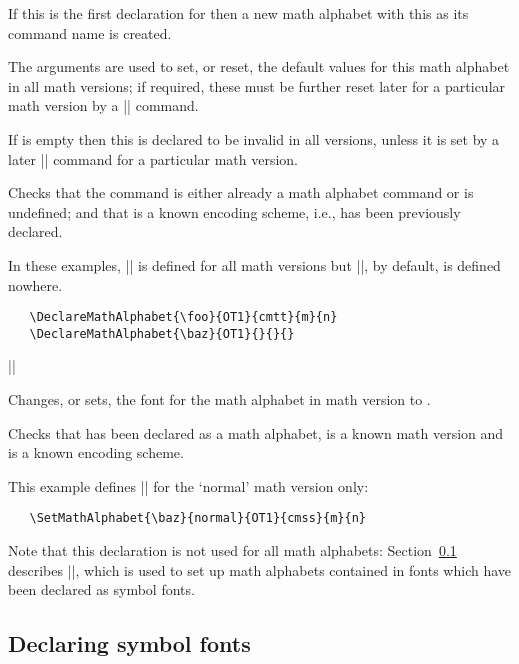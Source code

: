 \documentclass{ltxguide}[1995/11/28]
\begin{document}
If this is the first declaration for  then a new math
alphabet with this as its command name is created.

The arguments     are used to
set, or reset, the default values for this math alphabet in all math
versions; if required, these must be further reset later for a
particular math version by a |\SetMathAlphabet| command.

If  is empty then this  is declared to be invalid
in all versions, unless it is set by a later |\SetMathAlphabet| command
for a particular math version.

Checks that the command  is either already a math alphabet
command or is undefined; and that  is a known encoding
scheme, i.e., has been previously declared.

In these examples, |\foo| is defined for all math versions but |\baz|,
by default, is defined nowhere.
\begin{verbatim}
   \DeclareMathAlphabet{\foo}{OT1}{cmtt}{m}{n}
   \DeclareMathAlphabet{\baz}{OT1}{}{}{}
\end{verbatim}


\begin{decl}
  |\SetMathAlphabet|  \\
         \null\hfill {}   
\end{decl}

Changes, or sets, the font for the math alphabet  in math
version  to .

Checks that  has been declared as a math alphabet,
 is a known math version and  is a known encoding
scheme.

\newpage

This example defines |\baz| for the `normal' math version only:
\begin{verbatim}
   \SetMathAlphabet{\baz}{normal}{OT1}{cmss}{m}{n}
\end{verbatim}

Note that this declaration is not used for all math alphabets:
Section~\ref{sec:symalph} describes |\DeclareSymbolFontAlphabet|, which
is used to set up math alphabets contained in fonts which have been
declared as symbol fonts.

\subsection{Declaring symbol fonts}
\label{sec:symalph}
\end{document}
